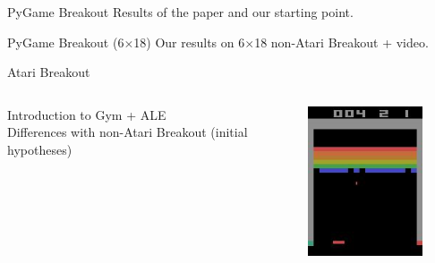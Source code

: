 \begin{frame}{PyGame Breakout}
    Results of the paper and our starting point.
\end{frame}

\begin{frame}{PyGame Breakout (6$\times$18)}
    Our results on 6$\times$18 non-Atari Breakout + video.
\end{frame}

\begin{frame}{Atari Breakout}
    \begin{columns}[c,onlytextwidth]
            Introduction to Gym + ALE\\
            Differences with non-Atari Breakout (initial hypotheses)
            \begin{figure}
                \includegraphics[width=\textwidth]{images/gym-breakout-image-example.jpg}
            \end{figure}
    \end{columns}
\end{frame}
